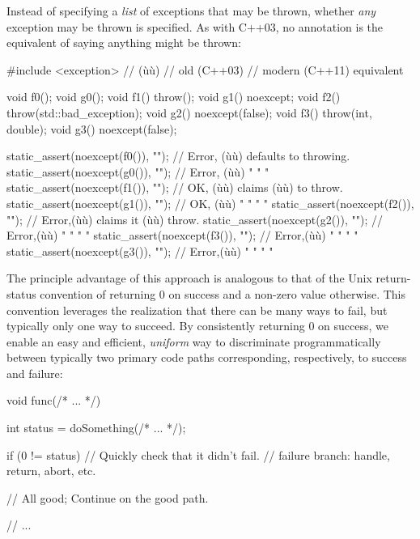 \noindent Instead of specifying a \emph{list} of exceptions that may be thrown,
whether \emph{any} exception may be thrown is specified. As with C++03,
no annotation is the equivalent of saying anything might be thrown:

\begin{emcppslisting}
#include <exception>  // (ù{}ù)
// old (C++03)                         // modern (C++11) equivalent

void f0();                             void g0();
void f1() throw();                     void g1() noexcept;
void f2() throw(std::bad_exception);   void g2() noexcept(false);
void f3() throw(int, double);          void g3() noexcept(false);

static_assert(noexcept(f0()), "");  // Error, (ù{}ù) defaults to throwing.
static_assert(noexcept(g0()), "");  // Error, (ù{}ù)     "     "     "
static_assert(noexcept(f1()), "");  // OK,    (ù{}ù) claims (ù{}ù) to throw.
static_assert(noexcept(g1()), "");  // OK,    (ù{}ù)    "    "   "   "
static_assert(noexcept(f2()), "");  // Error,(ù{}ù) claims it (ù{}ù) throw.
static_assert(noexcept(g2()), "");  // Error,(ù{}ù)    "    "  "    "
static_assert(noexcept(f3()), "");  // Error,(ù{}ù)    "    "  "    "
static_assert(noexcept(g3()), "");  // Error,(ù{}ù)    "    "  "    "
\end{emcppslisting}
    

\noindent The principle advantage of this approach is analogous to that of the
Unix return-status convention of returning 0 on success and a non-zero
value otherwise. This convention leverages the realization that there
can be many ways to fail, but typically only one way to succeed. By
consistently returning 0 on success, we enable an easy and efficient,
\emph{uniform} way to discriminate programmatically between typically
two primary code paths corresponding, respectively, to success and
failure:

\begin{emcppslisting}
void func(/* ... */)
{
    int status = doSomething(/* ... */);

    if (0 != status)  // Quickly check that it didn't fail.
    {
        // failure branch: handle, return, abort, etc.
    }

    // All good; Continue on the good path.

    // ...
}
\end{emcppslisting}
    

